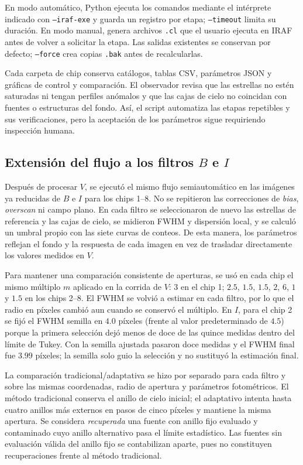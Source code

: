 \documentclass[12pt,letterpaper,oneside]{book}
\begin{document}
En modo automático, Python ejecuta los comandos mediante el intérprete indicado con \texttt{--iraf-exe} y guarda un registro por etapa; \texttt{--timeout} limita su duración. En modo manual, genera archivos \texttt{.cl} que el usuario ejecuta en IRAF antes de volver a solicitar la etapa. Las salidas existentes se conservan por defecto; \texttt{--force} crea copias \texttt{.bak} antes de recalcularlas.

Cada carpeta de chip conserva catálogos, tablas CSV, parámetros JSON y gráficas de control y comparación. El observador revisa que las estrellas no estén saturadas ni tengan perfiles anómalos y que las cajas de cielo no coincidan con fuentes o estructuras del fondo. Así, el script automatiza las etapas repetibles y sus verificaciones, pero la aceptación de los parámetros sigue requiriendo inspección humana.

\subsection{Extensión del flujo a los filtros $B$ e $I$}
\label{subsec:metodo-sextans-bi}

Después de procesar $V$, se ejecutó el mismo flujo semiautomático en las imágenes ya reducidas de $B$ e $I$ para los chips 1--8. No se repitieron las correcciones de \textit{bias}, \textit{overscan} ni campo plano. En cada filtro se seleccionaron de nuevo las estrellas de referencia y las cajas de cielo, se midieron FWHM y dispersión local, y se calculó un umbral propio con las siete curvas de conteos. De esta manera, los parámetros reflejan el fondo y la respuesta de cada imagen en vez de trasladar directamente los valores medidos en $V$.

Para mantener una comparación consistente de aperturas, se usó en cada chip el mismo múltiplo $m$ aplicado en la corrida de $V$: $3$ en el chip 1; $2.5$, $1.5$, $1.5$, $2$, $6$, $1$ y $1.5$ en los chips 2--8. El FWHM se volvió a estimar en cada filtro, por lo que el radio en píxeles cambió aun cuando se conservó el múltiplo. En $I$, para el chip 2 se fijó el FWHM semilla en $4.0$ píxeles (frente al valor predeterminado de $4.5$) porque la primera selección dejó menos de doce de las quince medidas dentro del límite de Tukey. Con la semilla ajustada pasaron doce medidas y el FWHM final fue $3.99$ píxeles; la semilla solo guio la selección y no sustituyó la estimación final.

La comparación tradicional/adaptativa se hizo por separado para cada filtro y sobre las mismas coordenadas, radio de apertura y parámetros fotométricos. El método tradicional conserva el anillo de cielo inicial; el adaptativo intenta hasta cuatro anillos más externos en pasos de cinco píxeles y mantiene la misma apertura. Se considera \emph{recuperada} una fuente con anillo fijo evaluado y contaminado cuyo anillo alternativo pasa el límite estadístico. Las fuentes sin evaluación válida del anillo fijo se contabilizan aparte, pues no constituyen recuperaciones frente al método tradicional.
\end{document}
